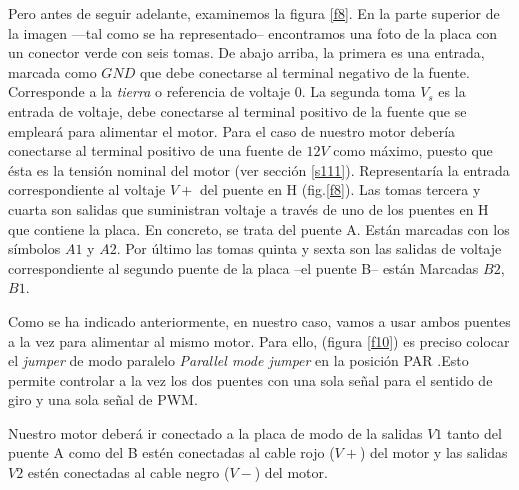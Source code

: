 \documentclass[10pt,a4paper]{report}
\begin{document}
Pero antes de seguir adelante, examinemos la figura \ref{f8}. En la parte superior de la imagen ---tal como se ha representado-- encontramos una foto de la placa con un conector verde con seis tomas. De abajo arriba, la primera es una entrada, marcada como $GND$ que debe conectarse al terminal negativo de la fuente. Corresponde a la \emph{tierra} o referencia de voltaje $0$. La segunda toma $V_{s}$ es la entrada de voltaje, debe conectarse al terminal positivo de la fuente que se empleará para alimentar el motor. Para el caso de nuestro motor debería conectarse al terminal positivo de una fuente de $12V$ como máximo, puesto que ésta es la tensión nominal del motor (ver sección \ref{s111}). Representaría la entrada correspondiente al voltaje $V+$ del puente en H (fig.\ref{f8}).  Las tomas tercera y cuarta son salidas que suministran voltaje a través de uno de los puentes en H que contiene la placa. En concreto, se trata del puente A. Están marcadas con los símbolos $A1$ y $A2$. Por último las tomas quinta y sexta son las salidas de voltaje correspondiente al segundo puente de la placa --el puente B-- están Marcadas $B2$, $B1$.

Como se ha indicado anteriormente, en nuestro caso, vamos a usar ambos puentes a la vez para alimentar al mismo motor. Para ello,  (figura \ref{f10}) es preciso colocar el \emph{jumper} de modo paralelo \emph{Parallel mode jumper} en la posición PAR .Esto permite controlar a la vez los dos puentes con una sola señal para el sentido de giro y una sola señal de PWM.

Nuestro motor deberá ir conectado a la placa de modo de la salidas $V1$ tanto del puente A como del B estén conectadas al  cable rojo ($V+$) del motor y las salidas $V2$ estén conectadas al cable negro ($V-$) del motor. 
\end{document}

